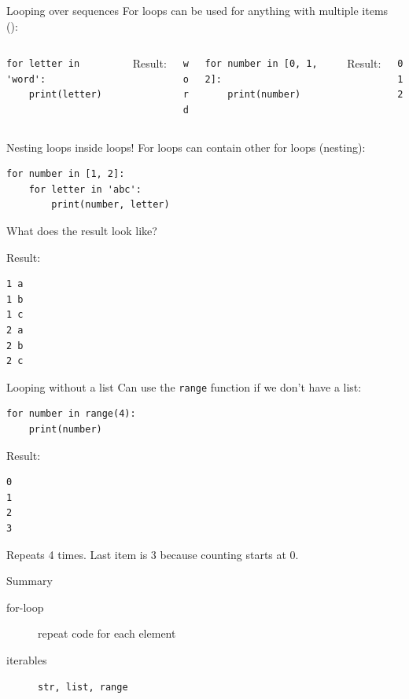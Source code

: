 \documentclass[aspectratio=169,usenames,dvipsnames]{beamer}
\begin{document}
\begin{frame}[fragile]{Looping over sequences}
For loops can be used for anything with multiple items ():
\begin{columns}
\begin{lstlisting}
for letter in 'word':
    print(letter)
\end{lstlisting}
Result:
\begin{lstlisting}
w
o
r
d
\end{lstlisting}
\begin{lstlisting}
for number in [0, 1, 2]:
    print(number)
\end{lstlisting}
Result:
\begin{lstlisting}
0
1
2
\end{lstlisting}
\end{columns}
\end{frame}

\begin{frame}[fragile]{Nesting loops inside loops!}
    For loops can contain other for loops (nesting):
\begin{lstlisting}
for number in [1, 2]:
    for letter in 'abc':
        print(number, letter)
\end{lstlisting}
What does the result look like?

\pause
Result:
\begin{lstlisting}
1 a
1 b
1 c
2 a
2 b
2 c
\end{lstlisting}
\end{frame}



\begin{frame}[fragile]{Looping without a list}
Can use the \lstinline{range} function
if we don't have a list:
\begin{lstlisting}
for number in range(4):
    print(number)
\end{lstlisting}

Result:
\begin{lstlisting}
0
1
2
3
\end{lstlisting}

Repeats 4 times. Last item is 3 because counting starts at 0.
\end{frame}


\begin{frame}{Summary}
    \begin{description}
        \item[for-loop] repeat code for each element
        \item[iterables] \lstinline{str, list, range}
    \end{description}
\end{frame}
\end{document}
